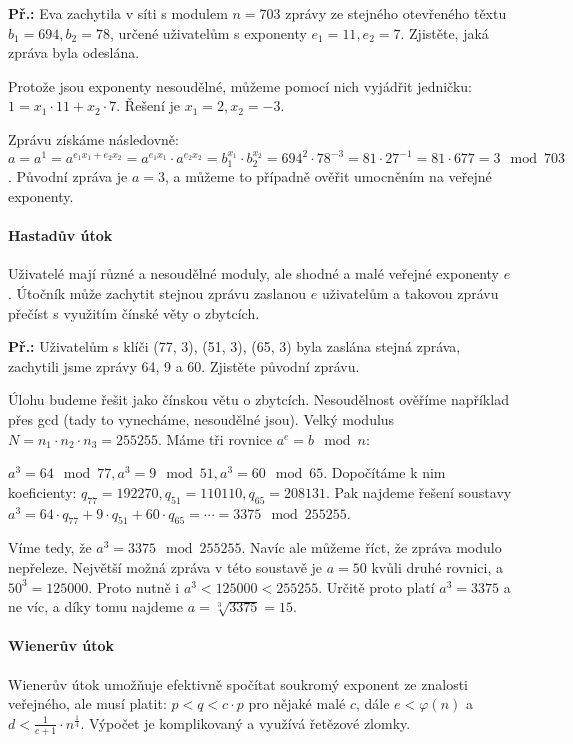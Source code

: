 \documentclass[10pt,a4paper]{article}
\begin{document}
\begin{exercise}
    \textbf{Př.:} Eva zachytila v síti s modulem $n = 703$ zprávy ze stejného
    otevřeného těxtu $b_1 = 694, b_2 = 78$, určené uživatelům s exponenty $e_1 =
    11, e_2 = 7$. Zjistěte, jaká zpráva byla odeslána.

    Protože jsou exponenty nesoudělné, můžeme pomocí nich vyjádřit jedničku: $1
    = x_1\cdot 11 + x_2 \cdot 7$. Řešení je $x_1 = 2, x_2 = -3$.

    Zprávu získáme následovně: $a = a^1 = a^{e_1x_1 + e_2x_2} = a^{e_1x_1}\cdot
    a^{e_2x_2} = b_1^{x_1} \cdot b_2^{x_2} = 694^2 \cdot 78^{-3} = 81 \cdot
    27^{-1} = 81 \cdot 677 = 3 \mod 703$. Původní zpráva je $a = 3$, a můžeme to
    případně ověřit umocněním na veřejné exponenty.
\end{exercise}

\paragraph{Hastadův útok}
Uživatelé mají různé a nesoudělné moduly, ale shodné a malé veřejné exponenty
$e$. Útočník může zachytit stejnou zprávu zaslanou $e$ uživatelům a takovou
zprávu přečíst s využitím čínské věty o zbytcích.

\begin{exercise}
    \textbf{Př.:} Uživatelům s klíči (77, 3), (51, 3), (65, 3) byla zaslána
    stejná zpráva, zachytili jsme zprávy 64, 9 a 60. Zjistěte původní zprávu.

    Úlohu budeme řešit jako čínskou větu o zbytcích. Nesoudělnost ověříme
    například přes gcd (tady to vynecháme, nesoudělné jsou). Velký modulus $N =
    n_1 \cdot n_2 \cdot n_3 = 255255$. Máme tři rovnice $a^e = b \mod n$: 

    $a^3 = 64 \mod 77, a^3 = 9 \mod 51, a^3 = 60 \mod 65$. Dopočítáme k nim
    koeficienty: $q_{77} = 192270, q_{51} = 110110, q_{65} = 208131$. Pak
    najdeme řešení soustavy $a^3 = 64\cdot q_{77} + 9\cdot q_{51} + 60 \cdot
    q_{65} = \cdots = 3375 \mod 255255$.

    Víme tedy, že $a^3 = 3375 \mod 255255$. Navíc ale můžeme říct, že zpráva
    modulo nepřeleze. Největší možná zpráva v této soustavě je $a=50$ kvůli
    druhé rovnici, a $50^3 = 125000$. Proto nutně i $a^3 < 125000 < 255255$.
    Určitě proto platí $a^3 = 3375$ a ne víc, a díky tomu najdeme $a =
    \sqrt[3]{3375} = 15$.
\end{exercise}

\paragraph{Wienerův útok}
Wienerův útok umožňuje efektivně spočítat soukromý exponent ze znalosti
veřejného, ale musí platit: $p < q < c \cdot p$ pro nějaké malé $c$, dále $e <
\varphi(n)$ a $d < \frac{1}{c+1}\cdot n^{\frac{1}{4}}$. Výpočet je komplikovaný a využívá řetězové zlomky.
\end{document}
